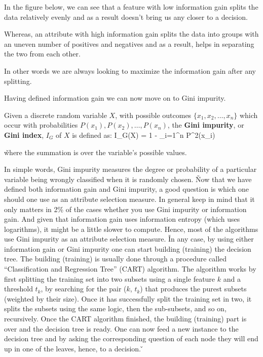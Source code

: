 \be
In the figure below, we can see that a feature with low information gain splits the data relatively evenly and as a
result doesn't bring us any closer to a decision.


Whereas, an attribute with high information gain splits the data into groups with an uneven number of positives and
negatives and as a result, helps in separating the two from each other.


In other words we are always looking to maximize the information gain after any splitting.
\ee

Having defined information gain we can now move on to Gini impurity.

Given a discrete random variable $X$, with possible outcomes $\{x_{1}, x_{2}, \ldots, x_{n} \}$ which occur with
probabilities $ P(x_{1}), P(x_{2}), \ldots, P(x_{n})$, the \textbf{Gini impurity}, or \textbf{Gini index}, $I_{G}$ of
$X$ is defined as:
\bse
I_{G}(X) = 1 - \sum _{i=1}^{n} P^2(x_{i})
\ese

\v

where the summation is over the variable's possible values.
\ed

In simple words, Gini impurity measures the degree or probability of a particular variable being wrongly classified
when it is randomly chosen.  \v

Now that we have defined both information gain and Gini impurity, a good question is which one should one use as an
attribute selection measure. In general keep in mind that it only matters in 2\% of the cases whether you use Gini
impurity or information gain. And given that information gain uses information entropy (which uses logarithms), it
might be a little slower to compute. Hence, most of the algorithms use Gini impurity as an attribute selection
measure. \v

In any case, by using either information gain or Gini impurity one can start building (training) the decision tree.
The building (training) is usually done through a procedure called ``Classification and Regression Tree'' (CART)
algorithm. The algorithm works by first splitting the training set into two subsets using a single feature $k$ and a
threshold $t_k$, by searching for the pair ($k$, $t_k$) that produces the purest subsets (weighted by their size).
Once it has successfully split the training set in two, it splits the subsets using the same logic, then the
sub-subsets, and so on, recursively. Once the CART algorithm finished, the building (training) part is over and the
decision tree is ready. One can now feed a new instance to the decision tree and by asking the corresponding
question of each node they will end up in one of the leaves, hence, to a decision. \v

